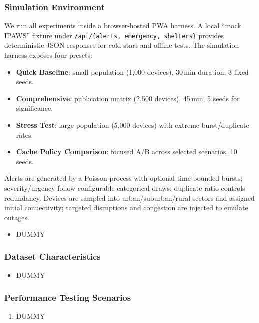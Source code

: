 \documentclass[11pt,twocolumn]{article}
\begin{document}
\subsubsection{Simulation Environment}
We run all experiments inside a browser-hosted PWA harness. A local “mock IPAWS” fixture under \texttt{/api/\{alerts, emergency, shelters\}} provides deterministic JSON responses for cold-start and offline tests. The simulation harness exposes four presets:

\begin{itemize}
  \item \textbf{Quick Baseline}: small population (1{,}000 devices), 30\,min duration, 3 fixed seeds.
  \item \textbf{Comprehensive}: publication matrix (2{,}500 devices), 45\,min, 5 seeds for significance.
  \item \textbf{Stress Test}: large population (5{,}000 devices) with extreme burst/duplicate rates.
  \item \textbf{Cache Policy Comparison}: focused A/B across selected scenarios, 10 seeds.
\end{itemize}

Alerts are generated by a Poisson process with optional time-bounded bursts; severity/urgency follow configurable categorical draws; duplicate ratio controls redundancy. Devices are sampled into urban/suburban/rural sectors and assigned initial connectivity; targeted disruptions and congestion are injected to emulate outages.

\begin{itemize}
\item DUMMY
\end{itemize}

\subsubsection{Dataset Characteristics}

\begin{itemize}
\item DUMMY
\end{itemize}

\subsubsection{Performance Testing Scenarios}

\begin{enumerate}
\item DUMMY
\end{enumerate}
\end{document}
